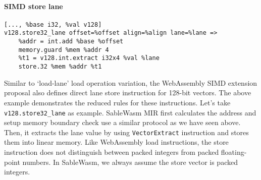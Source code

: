 \paragraph{SIMD store lane} \quad
\begin{lstlisting}[basicstyle=\linespread{1}\small\ttfamily, language=SableWasmMIR]
[..., %base i32, %val v128]
v128.store32_lane offset=%offset align=%align lane=%lane =>
    %addr = int.add %base %offset
    memory.guard %mem %addr 4
    %t1 = v128.int.extract i32x4 %val %lane
    store.32 %mem %addr %t1
\end{lstlisting}
Similar to `load-lane' load operation variation, the WebAssembly SIMD extension proposal also defines direct lane store instruction for 128-bit vectors. The above example demonstrates the reduced rules for these instructions. Let's take \texttt{v128.store32\_lane} as example. SableWasm MIR first calculates the address and setup memory boundary check use a similar protocol as we have seen above. Then, it extracts the lane value by using \texttt{VectorExtract} instruction and stores them into linear memory. Like WebAssembly load instructions, the store instruction does not distinguish between packed integers from packed floating-point numbers. In SableWasm, we always assume the store vector is packed integers.
